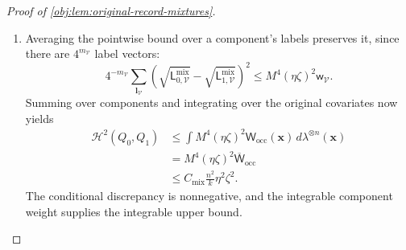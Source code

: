 \documentclass[11pt]{article}
\begin{document}
\begin{proof}[Proof of \cref{obj:lem:original-record-mixtures}]
\begin{enumerate}
The same table identities used in the amplitude cases, now applied
to a block average, imply
\[
\mathsf D_{\mathcal V}^{\mathrm{mix}}(0,\zeta_0)=0,\qquad
\mathsf D_{\mathcal V}^{\mathrm{mix}}(\eta_0,0)=0,\qquad
\partial_{\eta_0}\mathsf D_{\mathcal V}^{\mathrm{mix}}(\eta_0,0)=0.
\]
For the second identity, reverse the component signs, a permutation
of their uniform prior. The two closed segments joining zero to
\(\eta\) and \(\zeta\) lie inside the certificate's signed square.
The mean value bound along the \(\zeta_0\)-segment therefore gives
\[
|\partial_{\eta_0}\mathsf D_{\mathcal V}^{\mathrm{mix}}(\eta_0,\zeta)|
\le
2M^2m_{\mathcal V}^2 2^{m_{\mathcal V}}|\zeta|
\]
for every \(\eta_0\) between zero and \(\eta\). Applying the mean value
bound along that \(\eta_0\)-segment next gives
\[
|\mathsf D_{\mathcal V}^{\mathrm{mix}}(\eta,\zeta)|
\le
2M^2m_{\mathcal V}^2 2^{m_{\mathcal V}}|\eta\zeta|.
\]
Both estimates apply to either orientation of the segments.

The positive density floors justify the square-root identity and
bound
\[
\begin{aligned}
\left(
\sqrt{\mathsf L_{0,\mathcal V}^{\mathrm{mix}}}
-\sqrt{\mathsf L_{1,\mathcal V}^{\mathrm{mix}}}
\right)^2
&=
\frac{(\mathsf D_{\mathcal V}^{\mathrm{mix}}(\eta,\zeta))^2}
{\left(
\sqrt{\mathsf L_{0,\mathcal V}^{\mathrm{mix}}}
+\sqrt{\mathsf L_{1,\mathcal V}^{\mathrm{mix}}}
\right)^2}\\
&\le
\frac{4M^4m_{\mathcal V}^4 4^{m_{\mathcal V}}(\eta\zeta)^2}
{4\,2^{-m_{\mathcal V}}}\\
&=M^4(\eta\zeta)^2\mathsf w_{\mathcal V}.
\end{aligned}
\]
This proves the pointwise component bound for every block, including
the unused-sign block.

\item Averaging the pointwise bound over a component's labels preserves
it, since there are \(4^{m_{\mathcal V}}\) label vectors:
\[
4^{-m_{\mathcal V}}
\sum_{\boldsymbol l_{\mathcal V}}
\left(
\sqrt{\mathsf L_{0,\mathcal V}^{\mathrm{mix}}}
-\sqrt{\mathsf L_{1,\mathcal V}^{\mathrm{mix}}}
\right)^2
\le M^4(\eta\zeta)^2\mathsf w_{\mathcal V}.
\]
Summing over components and integrating over the original covariates
now yields
\[
\begin{aligned}
\mathcal H^2(Q_0,Q_1)
&\le
\int M^4(\eta\zeta)^2\mathsf W_{\mathrm{occ}}(\mathbf x)\,
d\lambda^{\otimes n}(\mathbf x)\\
&=M^4(\eta\zeta)^2\overline{\mathsf W}_{\mathrm{occ}}\\
&\le C_{\mathrm{mix}}\frac{n^2}{k}\eta^2\zeta^2.
\end{aligned}
\]
The conditional discrepancy is nonnegative, and the integrable
component weight supplies the integrable upper bound.


\end{enumerate}
\end{proof}
\end{document}
